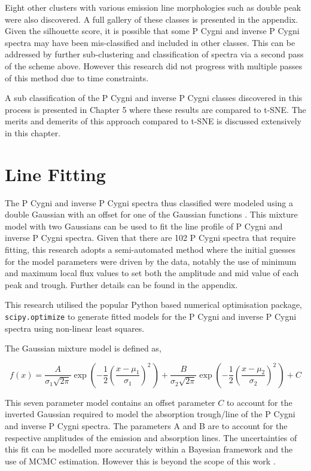 Eight other clusters with various emission line morphologies such as double peak were also discovered. A full gallery of these classes is presented in the appendix. Given the silhouette score, it is possible that some P Cygni and inverse P Cygni spectra may have been mis-classified and included in other classes. This can be addressed by further sub-clustering and classification of spectra via a second pass of the scheme above. However this research did not progress with multiple passes of this method due to time constraints. 

A sub classification of the P Cygni and inverse P Cygni classes discovered in this process is presented in Chapter 5 where these results are compared to t-SNE. The merits and demerits of this approach compared to t-SNE is discussed extensively in this chapter. 

\section{Line Fitting}

The P Cygni and inverse P Cygni spectra thus classified were modeled using a double Gaussian with an offset for one of the Gaussian functions \cite{traven2015gaia}\cite{traven2017galah}\cite{zhang2021catalog}. This mixture model with two Gaussians can be used to fit the line profile of P Cygni and inverse P Cygni spectra. Given that there are 102 P Cygni spectra that require fitting, this research adopts a semi-automated method where the initial guesses for the model parameters were driven by the data, notably the use of minimum and maximum local flux values to set both the amplitude and mid value of each peak and trough. Further details can be found in the appendix.

This research utilised the popular Python based numerical optimisation package, \texttt{scipy.optimize} to generate fitted models for the P Cygni and inverse P Cygni spectra using non-linear least squares.

The Gaussian mixture model is defined as, 

\begin{equation}
    f(x) = \frac{A}{\sigma_1\sqrt{2\pi}} 
  \exp\left( -\frac{1}{2}\left(\frac{x-\mu_1}{\sigma_1}\right)^{\!2}\,\right) + \frac{B}{\sigma_2\sqrt{2\pi}} 
  \exp\left( -\frac{1}{2}\left(\frac{x-\mu_2}{\sigma_2}\right)^{\!2}\,\right) + C
\end{equation}


This seven parameter model contains an offset parameter $C$ to account for the inverted Gaussian required to model the absorption trough/line of the P Cygni and inverse P Cygni spectra. The parameters A and B are to account for the respective amplitudes of the emission and absorption lines. The uncertainties of this fit can be modelled more accurately within a Bayesian framework and the use of MCMC estimation. However this is beyond the scope of this work \cite{hogg2010data}.

